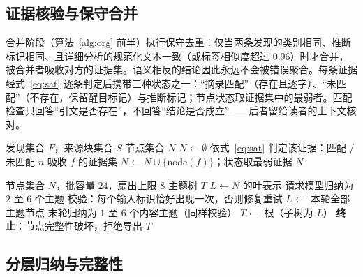 \documentclass[11pt]{article}
\begin{document}
\subsection{证据核验与保守合并}

合并阶段（算法~\ref{alg:org} 前半）执行保守去重：仅当两条发现的类别相同、推断标记相同、且详细分析的规范化文本一致（或标签相似度超过 $0.96$）时才合并，被合并者吸收对方的证据集。语义相反的结论因此永远不会被错误聚合。每条证据经式~\eqref{eq:sat} 逐条判定后携带三种状态之一：“摘录匹配”（存在且逐字）、“未匹配”（不存在，保留醒目标记）与推断标记；节点状态取证据集中的最弱者。匹配检查只回答“引文是否存在”，不回答“结论是否成立”——后者留给读者的上下文核对。

\begin{algorithm}[t]
\caption{证据核验与保守合并}
\label{alg:org}
\begin{algorithmic}[1]
\REQUIRE 发现集合 $F$，来源块集合 $S$
\ENSURE 节点集合 $N$
\STATE $N\leftarrow\emptyset$
    \STATE 依式~\eqref{eq:sat} 判定该证据：匹配 / 未匹配
  \ENDFOR
    \STATE $n$ 吸收 $f$ 的证据集 
  \ELSE
    \STATE $N\leftarrow N\cup\{\text{node}(f)\}$；状态取最弱证据
  \ENDIF
\ENDFOR
\RETURN $N$
\end{algorithmic}
\end{algorithm}

\begin{algorithm}[t]
\caption{分层归纳与完整性检查}
\label{alg:org2}
\begin{algorithmic}[1]
\REQUIRE 节点集合 $N$，批容量 $24$，扇出上限 $8$
\ENSURE 主题树 $T$
\STATE $L\leftarrow N$ 的叶表示
    \STATE 请求模型归纳为 $2$ 至 $6$ 个主题
    \STATE 校验：每个输入标识恰好出现一次，否则修复重试
  \ENDFOR
  \STATE $L\leftarrow$ 本轮全部主题节点
\ENDWHILE
{}
  \STATE 末轮归纳为 $1$ 至 $6$ 个内容主题（同样校验）
\ENDIF
\STATE $T\leftarrow$ 根（子树为 $L$）
  \STATE \textbf{终止}：节点完整性破坏，拒绝导出 
\ENDIF
\RETURN $T$
\end{algorithmic}
\end{algorithm}

\subsection{分层归纳与完整性}
\end{document}
